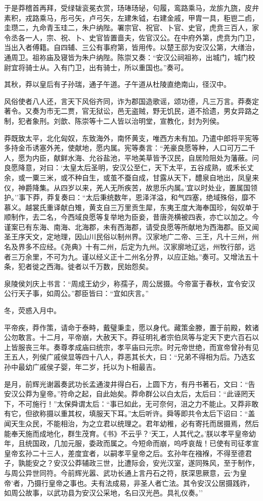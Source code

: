 \documentclass[]{article}
\begin{document}
于是莽稽首再拜，受绿韨衮冕衣赏，玚琫玚珌，句履，鸾路乘马，龙旂九旒，皮弁素积，戎路乘马，彤弓矢，卢弓矢，左建朱钺，右建金戚，甲胄一具，秬鬯二卣，圭瓒二，九命青玉珪二，朱户纳陛。署宗官、祝官、卜官、史官，虎贲三百人，家令丞各一人，宗、祝、卜、史官皆置啬夫，佐官汉公。在中府外第，虎贲为门卫，当出入者傅籍。自四辅、三公有事府第，皆用传。以楚王邸为安汉公第，大缮治，通周卫。祖祢庙及寝皆为朱户纳陛。陈崇又奏：``安汉公祠祖祢，出城门，城门校尉宜将骑士从。入有门卫，出有骑士，所以重国也。''奏可。

其秋，莽以皇后有子孙瑞，通子午道。子午道从杜陵直绝南山，径汉中。

风俗使者八人还，言天下风俗齐同，诈为郡国造歌谣，颂功德，凡三万言。莽奏定著令。又奏为市无二贾，官无狱讼，邑无盗贼，野无饥民，道不拾遗，男女异路之制，犯者象刑。刘歆、陈崇等十二人皆以治明堂，宣教化，封为列侯。

莽既致太平，北化匈奴，东致海外，南怀黄支，唯西方未有加。乃遣中郎将平宪等多持金币诱塞外羌，使献地，愿内属。宪等奏言：``羌豪良愿等种，人口可万二千人，愿为内臣，献鲜水海、允谷盐池，平地美草皆予汉民，自居险阻处为藩蔽。问良愿降意，对曰：`太皇太后圣明，安汉公至仁，天下太平，五谷成熟，或禾长丈余，或一粟三米，或不种自生，或茧不蚕自成，甘露从天下，醴泉自地出，凤皇来仪，神爵降集。从四岁以来，羌人无所疾苦，故思乐内属。'宜以时处业，置属国领护。''事下莽，莽复奏曰：``太后秉统数年，恩泽洋溢，和气四塞，绝域殊俗，靡不慕义。越裳氏重译献白雉，黄支自三万里贡生犀，东夷王度大海奉国珍，匈奴单于顺制作，去二名，今西域良愿等复举地为臣妾，昔唐尧横被四表，亦亡以加之。今谨案已有东海、南海、北海郡，未有西海郡，请受良愿等所献地为西海郡。臣又闻圣王序天文，定地理，因山川民俗以制州界。汉家地广二帝、三王，凡十三州，州名及界多不应经。《尧典》十有二州，后定为九州。汉家廓地辽远，州牧行部，远者三万余里，不可为九。谨以经义正十二州名分界，以应正始。''奏可。又增法五十条，犯者徙之西海。徙者以千万数，民始怨矣。

泉陵侯刘庆上书言：``周成王幼少，称孺子，周公居摄。今帝富于春秋，宜令安汉公行天子事，如周公。''郡臣皆曰：``宜如庆言。''

冬，荧惑入月中。

平帝疾，莽作策，请命于泰畤，戴璧秉圭，愿以身代。藏策金滕，置于前殿，敕诸公勿敢言。十二月，平帝崩，大赦天下。莽征明礼者宗伯凤等与定天下吏六百石以上皆服丧三年。奏尊孝成庙曰统宗，孝平庙曰元宗。时元帝世绝，而宣帝曾孙有见王五人，列侯广戚侯显等四十八人，莽恶其长大，曰：``兄弟不得相为后。乃选玄孙中最幼广戚侯子婴，年二岁，托以为卜相最吉。

是月，前辉光谢嚣奏武功长孟通浚井得白石，上圆下方，有丹书著石，文曰：``告安汉公莽为皇帝。''符命之起，自此始矣。莽命群公以白太后，太后曰：``此诬罔天下，不可施行！''太保舜谓太后：``事已如此，无可奈何，沮之力不能止。又莽非敢有它，但欲称摄以重其权，填服天下耳。''太后听许。舜等即共令太后下诏曰：``盖闻天生众民，不能相治，为之立君以统理之。君年幼稚，必有寄托而居摄焉，然后能奉天施而成地化，群生茂育。《书》不云乎？`天工，人其代之。'朕以孝平皇帝幼年，且统国政，几加元服，委政而属之。今短命而崩，呜呼哀哉！已使有司征孝宣皇帝玄孙二十三人，差度宜者，以嗣孝平皇帝之后。玄孙年在襁褓，不得至德君子，孰能安之？安汉公莽辅政三世，比遭际会，安光汉室，遂同殊风，至于制作，与周公异世同符。今前辉光嚣、武功长通上言丹石之符，朕深思厥意，云`为皇帝'者，乃摄行皇帝之事也。夫有法成易，非圣人者亡法。其令安汉公居摄践祚，如周公故事，以武功县为安汉公采地，名曰汉光邑。具礼仪奏。''
\end{document}
